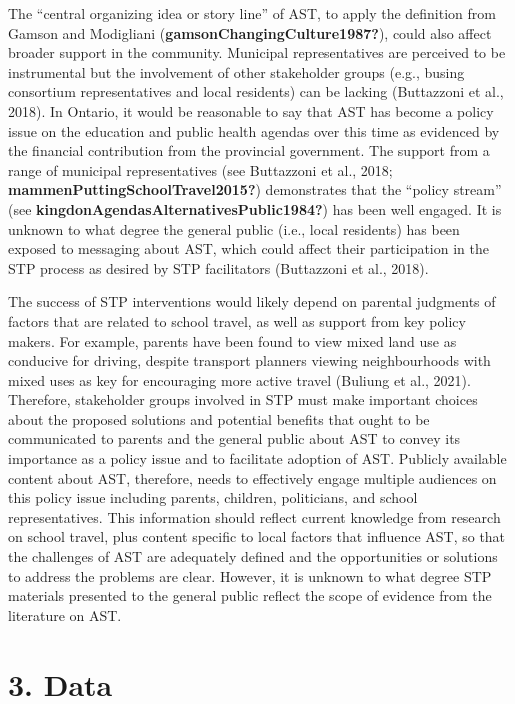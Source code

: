 \documentclass[]{elsarticle} %
\begin{document}
The ``central organizing idea or story line'' of AST, to apply the
definition from Gamson and Modigliani
(\textbf{gamsonChangingCulture1987?}), could also affect broader support
in the community. Municipal representatives are perceived to be
instrumental but the involvement of other stakeholder groups (e.g.,
busing consortium representatives and local residents) can be lacking
(Buttazzoni et al., 2018). In Ontario, it would be reasonable to say
that AST has become a policy issue on the education and public health
agendas over this time as evidenced by the financial contribution from
the provincial government. The support from a range of municipal
representatives (see Buttazzoni et al., 2018;
\textbf{mammenPuttingSchoolTravel2015?}) demonstrates that the ``policy
stream'' (see \textbf{kingdonAgendasAlternativesPublic1984?}) has been
well engaged. It is unknown to what degree the general public (i.e.,
local residents) has been exposed to messaging about AST, which could
affect their participation in the STP process as desired by STP
facilitators (Buttazzoni et al., 2018).

The success of STP interventions would likely depend on parental
judgments of factors that are related to school travel, as well as
support from key policy makers. For example, parents have been found to
view mixed land use as conducive for driving, despite transport planners
viewing neighbourhoods with mixed uses as key for encouraging more
active travel (Buliung et al., 2021). Therefore, stakeholder groups
involved in STP must make important choices about the proposed solutions
and potential benefits that ought to be communicated to parents and the
general public about AST to convey its importance as a policy issue and
to facilitate adoption of AST. Publicly available content about AST,
therefore, needs to effectively engage multiple audiences on this policy
issue including parents, children, politicians, and school
representatives. This information should reflect current knowledge from
research on school travel, plus content specific to local factors that
influence AST, so that the challenges of AST are adequately defined and
the opportunities or solutions to address the problems are clear.
However, it is unknown to what degree STP materials presented to the
general public reflect the scope of evidence from the literature on AST.

\hypertarget{data}{%
\section{3. Data}\label{data}}
\end{document}
